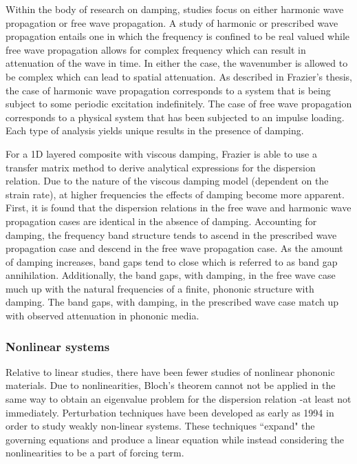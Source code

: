 \documentclass{article}
\begin{document}
Within the body of research on damping, studies focus on either harmonic wave 
propagation or free wave propagation. A study of harmonic or prescribed wave 
propagation entails one in which the frequency is confined to be real valued 
while free wave propagation allows for complex frequency which can result in 
attenuation of the wave in time. In either the case, the wavenumber is allowed 
to be complex which can lead to spatial attenuation. As described in Frazier's 
thesis, the case of harmonic wave propagation corresponds to a system that is 
being subject to some periodic excitation indefinitely. The case of free wave 
propagation corresponds to a physical system that has been subjected to an 
impulse loading. Each type of analysis yields unique results in the presence of 
damping. 

For a 1D layered composite with viscous damping, Frazier is able to use a 
transfer matrix method to derive analytical expressions for the dispersion 
relation. Due to the nature of the viscous damping model (dependent on the 
strain rate), at higher frequencies the effects of damping become more 
apparent. First, it is found that the dispersion relations in the free wave and 
harmonic wave propagation cases are identical in the absence of damping. 
Accounting for damping, the frequency band structure tends to ascend in the 
prescribed wave propagation case and descend in the free wave propagation case. 
As the amount of damping increases, band gaps tend to close which is referred 
to as band gap annihilation. Additionally, the band gaps, with damping, in the 
free wave case much up with the natural frequencies of a finite, phononic 
structure with damping. The band gaps, with damping, in the prescribed wave 
case match up with observed attenuation in phononic media. 

\subsubsection{Nonlinear systems}
Relative to linear studies, there have been fewer studies of nonlinear phononic 
materials. Due to nonlinearities, Bloch's theorem cannot not be applied in the 
same way to obtain an eigenvalue problem for the dispersion relation -at least 
not immediately. Perturbation techniques have been developed as early as 1994 
in order to study weakly non-linear systems. These techniques ``expand" the 
governing equations and produce a linear equation while instead considering the 
nonlinearities to be a part of forcing term.
\end{document}
